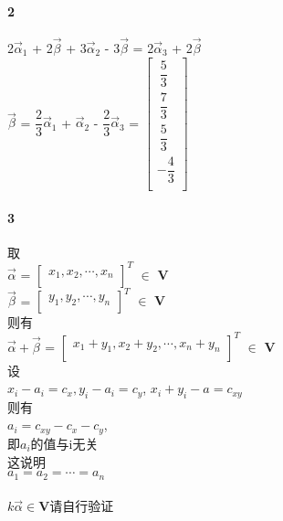 \documentclass{ctexart}
\begin{document}
    \paragraph{2}
        \begin{mdframed}
            2$\vec{\alpha}_1$ + 2$\vec{\beta}$ + 3$\vec{\alpha}_2$ - 3$\vec{\beta}$
                = 2$\vec{\alpha}_3$ + 2$\vec{\beta}$
                \\$\vec{\beta}$ = $\dfrac{2}{3} \vec{\alpha}_1$ + $\vec{\alpha}_2$ - $\dfrac{2}{3} \vec{\alpha}_3$
                = 
                $\renewcommand{\arraystretch}{1.7}
                \begin{bmatrix}
                ~\dfrac{5}{3}\\
                ~\dfrac{7}{3}\\
                ~\dfrac{5}{3}\\
                -\dfrac{4}{3}\\
                \end{bmatrix}$            
        \end{mdframed}


    \paragraph{3}
        \begin{mdframed}
            取\\
            $\vec{\alpha}$ = 
                $\begin{bmatrix}
                    x_1,x_2,\cdots,x_n\\
                \end{bmatrix}^{T}$ 
            $\in$ $\mathbf{V}$
            \\ $\vec{\beta}$ = 
            $\begin{bmatrix}
                y_1,y_2,\cdots,y_n\\
            \end{bmatrix}^T$ $\in$ $\mathbf{V}$\\
            则有\\
            $\vec{\alpha}+\vec{\beta}$ = 
                $\begin{bmatrix}
                    x_1+y_1 , x_2+y_2 , \cdots , x_n+y_n\\
                \end{bmatrix}^{T}$ 
            $\in$ $\mathbf{V}$\\
            设\\
            $x_i - a_i = c_x , y_i - a_i = c_y$,
                $x_i + y_i - a = c_{xy}$\\
            则有\\
            $a_i = c_{xy}-c_x-c_y$,\\
            即$a_i$的值与i无关\\
            这说明\\
            $a_1=a_2=\cdots=a_n$\\ \\
            $k\vec{\alpha}\in\mathbf{V}$请自行验证
        \end{mdframed}
\end{document}
